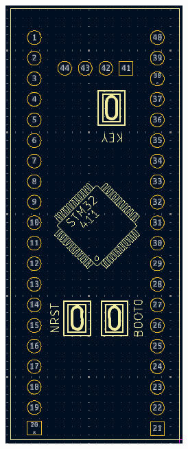 \begin{figure}[H]
\begin{subfigure}{0.1\textwidth}
        \includegraphics[width=\linewidth]{img//blackpill/KiCadFOOTPRINT1.png}

\end{subfigure}
\end{figure}
